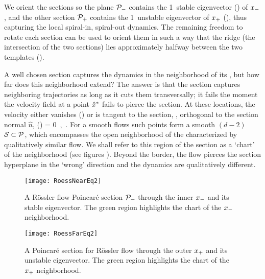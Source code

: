 We orient the sections so the plane ${\cal P}_{-}$ contains the 1\dmn\
stable eigenvector () of $x_{-}$, and the other section
${\cal P}_{+}$ contains the 1\dmn\ unstable eigenvector of $x_{+}$
(\reffig{fig:RoessFarEq}), thus capturing the local spiral-in,
spiral-out dynamics. The remaining freedom to rotate each section can be
used to orient them in such a way that the ridge (the intersection of
the two sections) lies approximately halfway between the two templates
(\reffig{fig:RoessBothEq}).

A well chosen section captures the dynamics in the neighborhood of its
\template, but how far does this neighborhood extend?
The answer is that the section captures neighboring trajectories as long
as it cuts them transversally; it fails the moment the velocity field at 
a point $\hat{x}^\ast$ fails to pierce the section. At these locations, the
velocity either vanishes (\eqv) or is tangent to the section, \ie,
orthogonal to the section normal $\hat{n}$,
\beq
     \cdot \vel(\sspRSing) = 0
\,,\qquad
    \sspRSing \in {}
\,.
For a smooth flows such points form a smooth $(d\!-\!2)$\dmn\
\emph{\poincBord} ${\cal S} \subset {\cal P}$, which encompasses the open
neighborhood of the {\template} characterized by qualitatively similar
flow. We shall refer to this region of the section as a
`chart' of the {\template} neighborhood (see figures ). Beyond the border, the flow pierces the section hyperplane in the `wrong' direction and the dynamics are qualitatively different.


\begin{figure}%
\begin{center}
  \texttt{[image: RoessNearEq2]}
\end{center}
  \caption{\label{fig:RoessNearEq}
  A R\"ossler flow Poincar\'e section ${\cal P}_{-}$ through the inner
  {\eqv} $x_{-}$ and its stable eigenvector. The green region highlights the chart of the $x_{-}$ neighborhood.
}
\end{figure}

\begin{figure}%
\begin{center}
  \texttt{[image: RoessFarEq2]}
\end{center}
  \caption[R\"ossler section, outer {\eqv}]{
  A Poincar\'e section for R\"ossler flow
      through the
      outer
  {\eqv} $x_{+}$  and its unstable eigenvector. The green region highlights the chart of the $x_{+}$ neighborhood.
  } \label{fig:RoessFarEq}
\end{figure}

